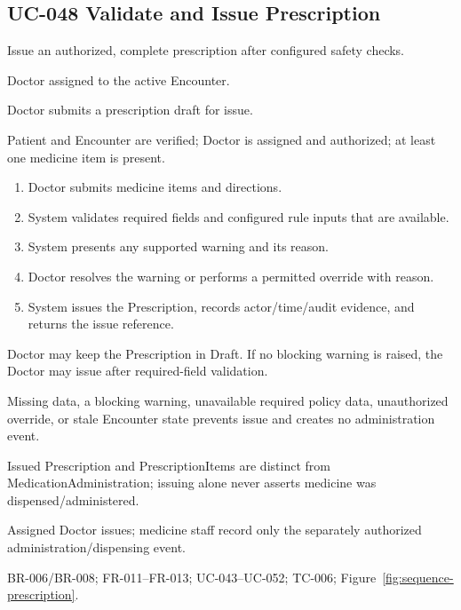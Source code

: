 \documentclass[a4paper,12pt]{article}
\begin{document}
\subsection{UC-048 Validate and Issue Prescription}
\begin{description}[leftmargin=2.6cm,style=nextline]
\item[Goal] Issue an authorized, complete prescription after configured safety checks.
\item[Primary actor] Doctor assigned to the active Encounter.
\item[Trigger] Doctor submits a prescription draft for issue.
\item[Preconditions] Patient and Encounter are verified; Doctor is assigned and authorized; at least one medicine item is present.
\item[Main success flow]
\begin{enumerate}[leftmargin=1.4em]
  \item Doctor submits medicine items and directions.
  \item System validates required fields and configured rule inputs that are available.
  \item System presents any supported warning and its reason.
  \item Doctor resolves the warning or performs a permitted override with reason.
  \item System issues the Prescription, records actor/time/audit evidence, and returns the issue reference.
\end{enumerate}
\item[Alternative flows] Doctor may keep the Prescription in Draft. If no blocking warning is raised, the Doctor may issue after required-field validation.
\item[Exception flows] Missing data, a blocking warning, unavailable required policy data, unauthorized override, or stale Encounter state prevents issue and creates no administration event.
\item[Postconditions and data] Issued Prescription and PrescriptionItems are distinct from MedicationAdministration; issuing alone never asserts medicine was dispensed/administered.
\item[Authorization] Assigned Doctor issues; medicine staff record only the separately authorized administration/dispensing event.
\item[Trace] BR-006/BR-008; FR-011--FR-013; UC-043--UC-052; TC-006; Figure~\ref{fig:sequence-prescription}.
\end{description}
\end{document}
